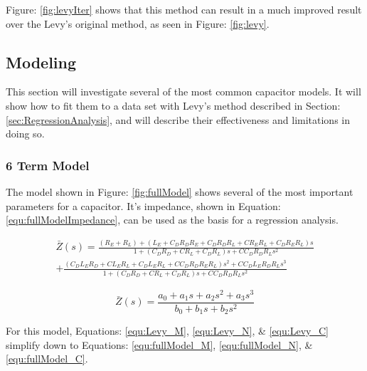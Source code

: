 


Figure: \ref{fig:levyIter} shows that this method can result in a much improved result over the Levy's original method, as seen in Figure: \ref{fig:levy}.




\subsection{Modeling}
This section will investigate several of the most common capacitor models. It will show how to fit them to a data set with Levy's method described in Section: \ref{sec:RegressionAnalysis}, and will describe their effectiveness and limitations in doing so.

\subsubsection{6 Term Model}


The model shown in Figure: \ref{fig:fullModel} shows several of the most important parameters for a capacitor. It's impedance, shown in Equation: \eqref{equ:fullModelImpedance}, can be used as the basis for a regression analysis.

\begin{equation}
    \begin{split}
        \label{equ:fullModelImpedance}
        \bar{Z}(s) = \frac{(R_E + R_L) + (L_E + C_DR_DR_E + C_DR_DR_L + CR_ER_L + C_DR_ER_L)s}{1 + (C_DR_D + CR_L + C_DR_L)s + CC_DR_DR_Ls^2} \\ 
        + \frac{(C_DL_ER_D + CL_ER_L + C_DL_ER_L + CC_DR_DR_ER_L)s^2 + CC_DL_ER_DR_Ls^3}{1 + (C_DR_D + CR_L + C_DR_L)s + CC_DR_DR_Ls^2}
    \end{split}
\end{equation}

\begin{equation}
    \label{equ:fullModelPoly}
    \bar{Z}(s) = \frac{a_0 + a_1s + a_2s^2 + a_3s^3}{b_0 + b_1s + b_2s^2}
\end{equation}


For this model, Equations: \eqref{equ:Levy_M}, \eqref{equ:Levy_N}, \& \eqref{equ:Levy_C} simplify down to Equations: \eqref{equ:fullModel_M}, \eqref{equ:fullModel_N}, \& \eqref{equ:fullModel_C}.

